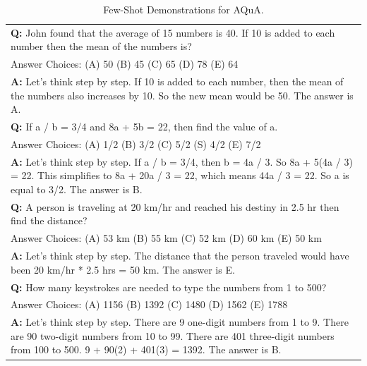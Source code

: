 \documentclass[11pt]{article}
\begin{document}
\begin{table}[ht]
    \centering
    \begin{tabularx}{\textwidth}{X}
    \toprule 
    \textbf{Q: }John found that the average of 15 numbers is 40. If 10 is added to each number then the mean of the numbers is? \\
    Answer Choices: (A) 50 (B) 45 (C) 65 (D) 78 (E) 64 \\
    \textbf{A: } Let's think step by step. If 10 is added to each number, then the mean of the numbers also increases by 10. So the new mean would be 50. The answer is A. \\
    \hdashline 
    \textbf{Q: }If a / b = 3/4 and 8a + 5b = 22, then find the value of a. \\
    Answer Choices: (A) 1/2 (B) 3/2 (C) 5/2 (S) 4/2 (E) 7/2 \\
    \textbf{A: } Let's think step by step. If a / b = 3/4, then b = 4a / 3. So 8a + 5(4a / 3) = 22. This simplifies to 8a + 20a / 3 = 22, which means 44a / 3 = 22. So a is equal to 3/2. The answer is B.\\
    \hdashline
    \textbf{Q: }A person is traveling at 20 km/hr and reached his destiny in 2.5 hr then find the distance? \\
    Answer Choices: (A) 53 km (B) 55 km (C) 52 km (D) 60 km (E) 50 km \\
    \textbf{A: }Let's think step by step. The distance that the person traveled would have been 20 km/hr * 2.5 hrs = 50 km. The answer is E.\\
    \hdashline
    \textbf{Q: }How many keystrokes are needed to type the numbers from 1 to 500? \\
    Answer Choices: (A) 1156 (B) 1392 (C) 1480 (D) 1562 (E) 1788 \\
    \textbf{A: }Let's think step by step. There are 9 one-digit numbers from 1 to 9. There are 90 two-digit numbers from 10 to 99. There are 401 three-digit numbers from 100 to 500. 9 + 90(2) + 401(3) = 1392. The answer is B.\\
    \bottomrule
    \end{tabularx}
    \caption{Few-Shot Demonstrations for AQuA.}
    \label{tab:fs_aqua}
\end{table}
\end{document}
